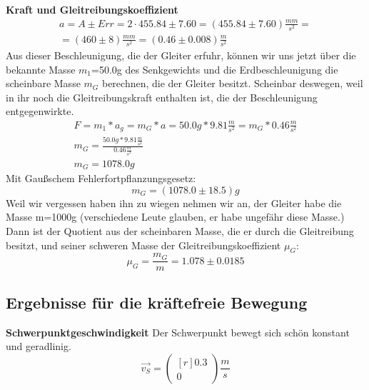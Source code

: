 \documentclass{article}
\begin{document}
\textbf{Kraft und Gleitreibungskoeffizient}
\begin{gather*}
a=A\pm Err=2\cdot 455.84 \pm 7.60=(455.84\pm 7.60)\frac{mm}{s^2}= \\
=(460\pm8)\frac{mm}{s^2}=(0.46\pm0.008)\frac{m}{s^2}
\end{gather*}
Aus dieser Beschleunigung, die der Gleiter erfuhr, können wir uns jetzt über die bekannte Masse $m_1$=50.0g des Senkgewichts und die Erdbeschleunigung die scheinbare Masse $m_G$ berechnen, die der Gleiter besitzt. Scheinbar deswegen, weil in ihr noch die Gleitreibungskraft enthalten ist, die der Beschleunigung entgegenwirkte.
\begin{gather}
F=m_1*a_g=m_G*a=50.0g*9.81\frac{m}{s^2}=m_G*0.46\frac{m}{s^2} \\
m_G=\frac{50.0g*9.81\frac{m}{s^2}}{0.46\frac{m}{s^2}} \\
m_G=1078.0g
\end{gather}
Mit Gaußschem Fehlerfortpflanzungsgesetz:
\begin{equation}
m_G=(1078.0 \pm18.5)g
\end{equation}
Weil wir vergessen haben ihn zu wiegen nehmen wir an, der Gleiter habe die Masse m=1000g (verschiedene Leute glauben, er habe ungefähr diese Masse.) Dann ist der Quotient aus der scheinbaren Masse, die er durch die Gleitreibung besitzt, und seiner schweren Masse der Gleitreibungskoeffizient $\mu_G$:
\begin{equation}
\mu_G=\frac{m_G}{m}=1.078\pm0.0185
\end{equation}


\subsection{Ergebnisse für die kräftefreie Bewegung}

\textbf{Schwerpunktgeschwindigkeit}
Der Schwerpunkt bewegt sich schön konstant und geradlinig.
\begin{equation}
\vec{v_S}=
\begin{pmatrix*}[r]
0.3 \\ 0
\end{pmatrix*}\frac{m}{s}
\end{equation}
\end{document}
